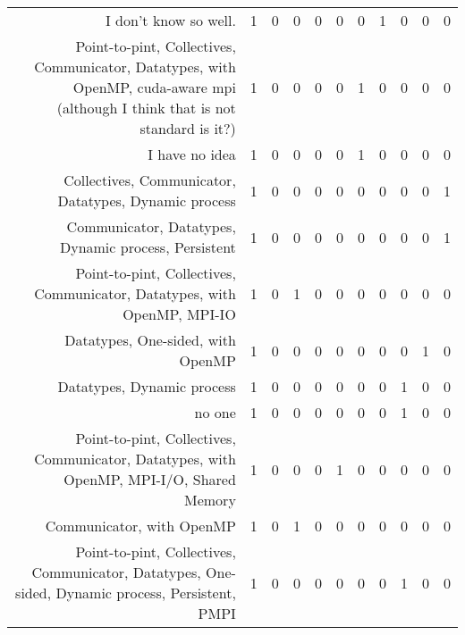 {\begin{landscape}
\begin{longtable}[htb]{r|c|c|c|c|c|c|c|c|c|c}
{I don't know so well.} & 1 & 0 & 0 & 0 & 0 & 0 & 1 & 0 & 0 & 0 \\%
{Point-to-pint, Collectives, Communicator, Datatypes, with OpenMP, cuda-aware mpi (although I think that is not standard is it?)} & 1 & 0 & 0 & 0 & 0 & 1 & 0 & 0 & 0 & 0 \\%
{I have no idea} & 1 & 0 & 0 & 0 & 0 & 1 & 0 & 0 & 0 & 0 \\%
{Collectives, Communicator, Datatypes, Dynamic process} & 1 & 0 & 0 & 0 & 0 & 0 & 0 & 0 & 0 & 1 \\%
{Communicator, Datatypes, Dynamic process, Persistent} & 1 & 0 & 0 & 0 & 0 & 0 & 0 & 0 & 0 & 1 \\%
{Point-to-pint, Collectives, Communicator, Datatypes, with OpenMP, MPI-IO} & 1 & 0 & 1 & 0 & 0 & 0 & 0 & 0 & 0 & 0 \\%
{Datatypes, One-sided, with OpenMP} & 1 & 0 & 0 & 0 & 0 & 0 & 0 & 0 & 1 & 0 \\%
{Datatypes, Dynamic process} & 1 & 0 & 0 & 0 & 0 & 0 & 0 & 1 & 0 & 0 \\%
{no one} & 1 & 0 & 0 & 0 & 0 & 0 & 0 & 1 & 0 & 0 \\%
{Point-to-pint, Collectives, Communicator, Datatypes, with OpenMP, MPI-I/O, Shared Memory} & 1 & 0 & 0 & 0 & 1 & 0 & 0 & 0 & 0 & 0 \\%
{Communicator, with OpenMP} & 1 & 0 & 1 & 0 & 0 & 0 & 0 & 0 & 0 & 0 \\%
{Point-to-pint, Collectives, Communicator, Datatypes, One-sided, Dynamic process, Persistent, PMPI} & 1 & 0 & 0 & 0 & 0 & 0 & 0 & 1 & 0 & 0 \\%
\hline%
\end{longtable}%
\end{landscape}}%
\clearpage%
